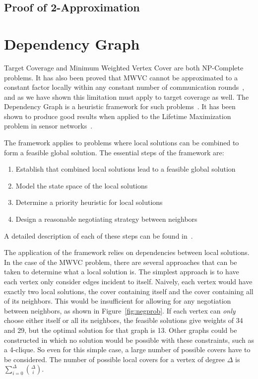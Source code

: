 

\subsection{Proof of 2-Approximation}


\section{Dependency Graph}
\label{sec:life-depend}
Target Coverage and Minimum Weighted Vertex Cover are both NP-Complete problems. It has also been proved that MWVC cannot be approximated to a constant factor locally within any constant number of communication rounds~\cite{1011811}, and as we have shown this limitation must apply to target coverage as well. The Dependency Graph is a heuristic framework for such problems~\cite{IPDPS.2008.45361}. It has been shown to produce good results when applied to the Lifetime Maximization problem in sensor networks~\cite{978-3-540-89894-8_26}.

The framework applies to problems where local solutions can be combined to form a feasible global solution. The essential steps of the framework are: 
\begin{enumerate}
\item Establish that combined local solutions lead to a feasible global solution
\item Model the state space of the local solutions
\item Determine a priority heuristic for local solutions
\item Design a reasonable negotiating strategy between neighbors
\end{enumerate} 
A detailed description of each of these steps can be found in~\cite{IPDPS.2008.45361}.

The application of the framework relies on dependencies between local solutions. In the case of the MWVC problem, there are several approaches that can be taken to determine what a local solution is. The simplest approach is to have each vertex only consider edges incident to itself. Naively, each vertex would have exactly two local solutions, the cover containing itself and the cover containing all of its neighbors. This would be insufficient for allowing for any negotiation between neighbors, as shown in Figure~\ref{fig:negprob}. If each vertex can {\em only} choose either itself or all its neighbors, the feasible solutions give weights of 34 and 29, but the optimal solution for that graph is 13. Other graphs could be constructed in which no solution would be possible with these constraints, such as a 4-clique. So even for this simple case, a large number of possible covers have to be considered. The number of possible local covers for a vertex of degree $\Delta$ is $\sum_{i=0}^\Delta \binom{\Delta}{i}$.

